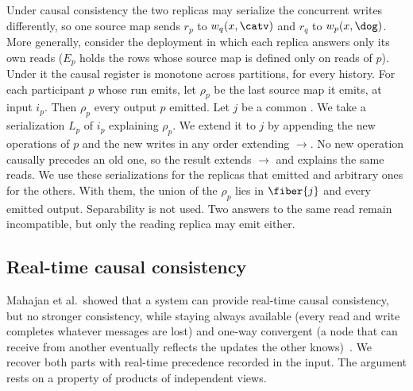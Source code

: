 Under causal consistency the two replicas may serialize the concurrent writes
differently, so one source map sends $r_p$ to $w_q(x,\catv)$ and $r_q$ to
$w_p(x,\dog)$.  More generally, consider the deployment in which each replica
answers only its own reads ($E_p$ holds the rows whose source map is defined
only on reads of $p$).  Under it the causal register is monotone across
partitions, for every history.  For each participant $p$ whose run emits, let
$\rho_p$ be the last source map it emits, at input $i_p$.  Then $\rho_p$
\outrel every output $p$ emitted.  Let $j$ be a common \indesc.  We take a
serialization $L_p$ of $i_p$ explaining $\rho_p$.  We extend it to $j$ by
appending the new operations of $p$ and the new writes in any order extending
$\to$.  No new operation causally precedes an old one, so the result extends
$\to$ and explains the same reads.  We use these serializations for the
replicas that emitted and arbitrary ones for the others.  With them, the union
of the $\rho_p$ lies in $\fiber{j}$ and \outrel every emitted output.
Separability is not used.  Two answers to the same read remain incompatible,
but only the reading replica may emit either.

\subsection{Real-time causal consistency}
\label{app:rtc}

Mahajan et al.\ showed that a system can provide real-time causal consistency,
but no stronger consistency, while staying always available (every read and
write completes whatever messages are lost) and one-way convergent (a node that can receive from another eventually reflects the updates the other
knows)~\cite{mahajan2011consistency}.  We recover both parts with real-time
precedence recorded in the input.  The argument rests on a property of
products of independent views.

